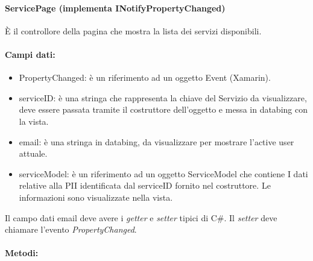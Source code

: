 \paragraph{ServicePage (implementa INotifyPropertyChanged)}
È il controllore della pagina che mostra la lista dei servizi disponibili.
\paragraph{Campi dati:}
\begin{itemize}
    \item PropertyChanged: è un riferimento ad un oggetto Event (Xamarin).
    \item serviceID: è una stringa che rappresenta la chiave del Servizio da visualizzare, deve essere passata tramite il costruttore dell’oggetto e messa in databing con la vista.
    \item email: è una stringa in databing, da visualizzare per mostrare l’active user attuale. 
    \item serviceModel: è un riferimento ad un oggetto ServiceModel che contiene I dati relative alla PII identificata dal serviceID fornito nel costruttore. Le informazioni sono visualizzate nella vista.
\end{itemize}

Il campo dati email deve avere i \emph{getter} e \emph{setter} tipici di C\#. Il \emph{setter} deve chiamare l’evento \emph{PropertyChanged}.
\paragraph{Metodi:}

